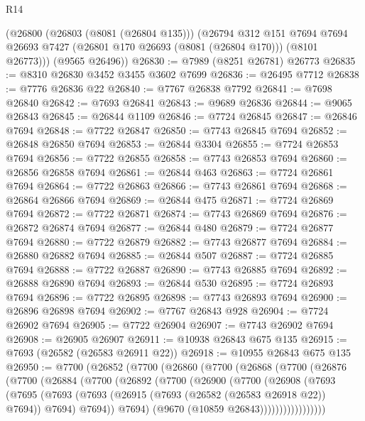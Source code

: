 \begin{lexlean}{R14}
\begin{coremodule}
      (@26800
        (@26803 (@8081 (@26804 @135)))
        (@26794
          @312
          @151
          @7694
          @7694
          @26693
          @7427
          (@26801 @170 @26693 (@8081 (@26804 @170)))
          (@8101 @26773)))
      (@9565 @26496))
@26830 := @7989 (@8251 @26781) @26773
@26835 := @8310 @26830 @3452 @3455 @3602 @7699
@26836 := @26495 @7712
@26838 := @7776 @26836 @22
@26840 := @7767 @26838 @7792
@26841 := @7698 @26840
@26842 := @7693 @26841
@26843 := @9689 @26836
@26844 := @9065 @26843
@26845 := @26844 @1109
@26846 := @7724 @26845
@26847 := @26846 @7694
@26848 := @7722 @26847
@26850 := @7743 @26845 @7694
@26852 := @26848 @26850 @7694
@26853 := @26844 @3304
@26855 := @7724 @26853 @7694
@26856 := @7722 @26855
@26858 := @7743 @26853 @7694
@26860 := @26856 @26858 @7694
@26861 := @26844 @463
@26863 := @7724 @26861 @7694
@26864 := @7722 @26863
@26866 := @7743 @26861 @7694
@26868 := @26864 @26866 @7694
@26869 := @26844 @475
@26871 := @7724 @26869 @7694
@26872 := @7722 @26871
@26874 := @7743 @26869 @7694
@26876 := @26872 @26874 @7694
@26877 := @26844 @480
@26879 := @7724 @26877 @7694
@26880 := @7722 @26879
@26882 := @7743 @26877 @7694
@26884 := @26880 @26882 @7694
@26885 := @26844 @507
@26887 := @7724 @26885 @7694
@26888 := @7722 @26887
@26890 := @7743 @26885 @7694
@26892 := @26888 @26890 @7694
@26893 := @26844 @530
@26895 := @7724 @26893 @7694
@26896 := @7722 @26895
@26898 := @7743 @26893 @7694
@26900 := @26896 @26898 @7694
@26902 := @7767 @26843 @928
@26904 := @7724 @26902 @7694
@26905 := @7722 @26904
@26907 := @7743 @26902 @7694
@26908 := @26905 @26907
@26911 := @10938 @26843 @675 @135
@26915 := @7693 (@26582 (@26583 @26911 @22))
@26918 := @10955 @26843 @675 @135
@26950 := @7700
    (@26852
      (@7700
        (@26860
          (@7700
            (@26868
              (@7700
                (@26876
                  (@7700
                    (@26884
                      (@7700
                        (@26892
                          (@7700
                            (@26900
                              (@7700
                                (@26908
                                  (@7693
                                    (@7695
                                      (@7693
                                        (@7693
                                          (@26915 (@7693 (@26582 (@26583 @26918 @22)) @7694))
                                          @7694)
                                        @7694))
                                    @7694)
                                  (@9670 (@10859 @26843)))))))))))))))))

\end{coremodule}
\end{lexlean}
